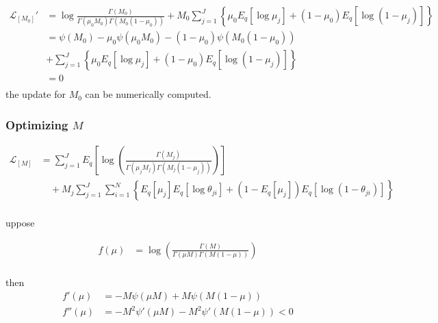 \documentclass[11pt,reqno]{amsart}
\begin{document}
\begin{equation}
\begin{split}
\label{M_0}
\mathcal{L}_{[M_0]}' 
&= \log \frac{ \Gamma(M_0) } { \Gamma(\mu_0 M_0) \Gamma(M_0 (1-\mu_0))}  
+ M_0 \sum_{j=1}^{J} \left\lbrace \mu_0E_q  \left[ \log \mu_j \right] + ( 1 - \mu_0) E_q  \left[ \log (1 - \mu_j)\right]\right\rbrace  \\
&= \psi(M_0)  - \mu_0 \psi(\mu_0 M_0) - (1-\mu_0) \psi(M_0 (1-\mu_0))  \\
\quad &+ \sum_{j=1}^{J} \left\lbrace \mu_0E_q  \left[ \log \mu_j \right] + ( 1 - \mu_0) E_q  \left[ \log (1 - \mu_j)\right]\right\rbrace \\
&=0 \\
\end{split}
\end{equation}
the update for $ M_0 $ can be numerically computed.


\subsubsection{Optimizing $ M $}
\begin{equation}
\begin{split}
\label{M}
\mathcal{L}_{{[M]}} 
&= \sum_{j=1}^{J} E_q  \left[ \log \left( \frac{ \Gamma(M_j) } { \Gamma(\mu_j M_j) \Gamma(M_j (1-\mu_j)) }\right) \right] \\ 
&\quad + M_j \sum_{j=1}^{J} \sum_{i=1}^{N} \left\lbrace E_q \left[ \mu_j \right] E_q \left[ \log \theta_{ji} \right] + \left( 1 - E_q\left[ \mu_j \right]  \right) E_q\left[ \log \left( 1 - \theta_{ji}\right) \right] \right\rbrace \\
\end{split}
\end{equation}

uppose

\begin{equation}
\begin{split}
f(\mu) &= \log\left( \frac{\Gamma(M)}{\Gamma(\mu M) \Gamma(M (1-\mu ))}\right) \nonumber \\
\end{split}
\end{equation}

then
\begin{align}
f'(\mu) &= -M \psi (\mu M) + M \psi(M (1-\mu )) \nonumber \\
f''(\mu) &= -M^2 \psi ' (\mu M) - M^2 \psi '(M (1-\mu )) <0 \nonumber \\
\end{align}
\end{document}
